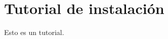 \documentclass[../main.tex]{subfiles}
\begin{document}
\section{Tutorial de instalación}
Esto es un tutorial.
\clearpage
\end{document}
